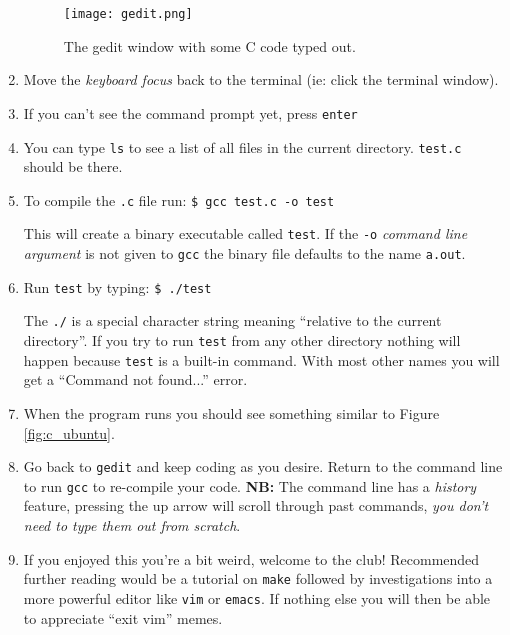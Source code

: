 \documentclass{lab}
\begin{document}
\begin{enumerate}
\begin{figure}[H]
\begin{center}
\texttt{[image: gedit.png]}
\end{center}
\caption{The gedit window with some C code typed out.}\label{fig:gedit}
\end{figure}

\item Move the \textit{keyboard focus} back to the terminal (ie: click the terminal window).

\item If you can't see the command prompt yet, press \texttt{enter}

\item You can type \texttt{ls} to see a list of all files in the current directory. \texttt{test.c} should be there.

\item To compile the \texttt{.c} file run: \texttt{\$ gcc test.c -o test}

This will create a binary executable called \texttt{test}. If the \texttt{-o} \textit{command line argument} is not given to \texttt{gcc} the binary file defaults to the name \texttt{a.out}.

\item Run \texttt{test} by typing: \texttt{\$ ./test}

The \texttt{./} is a special character string meaning ``relative to the current directory''. If you try to run \texttt{test} from any other directory nothing will happen because \texttt{test} is a built-in command. With most other names you will get a ``Command not found...'' error.

\item When the program runs you should see something similar to Figure \ref{fig:c_ubuntu}.

\item Go back to \texttt{gedit} and keep coding as you desire. Return to the command line to run \texttt{gcc} to re-compile your code. \textbf{NB:} The command line has a \textit{history} feature, pressing the up arrow will scroll through past commands, \textit{you don't need to type them out from scratch}.

\item If you enjoyed this you're a bit weird, welcome to the club! Recommended further reading would be a tutorial on \texttt{make} followed by investigations into a more powerful editor like \texttt{vim} or \texttt{emacs}. If nothing else you will then be able to appreciate ``exit vim'' memes.
\end{enumerate}
\end{document}
